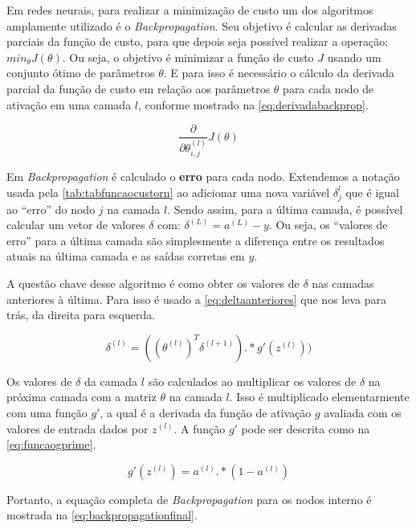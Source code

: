 Em redes neurais, para realizar a minimização de custo um dos algoritmos amplamente utilizado é o \textit{Backpropagation}. Seu objetivo é calcular as derivadas parciais da função de custo, para que depois seja possível realizar a operação: $min_{\theta}J(\theta)$. Ou seja, o objetivo é minimizar a função de custo $J$ usando um conjunto ótimo de parâmetros $\theta$. E para isso é necessário o cálculo da derivada parcial da função de custo em relação aos parâmetros $\theta$ para cada nodo de ativação em uma camada $l$, conforme mostrado na \autoref{eq:derivadabackprop}.

\begin{equation}\label{eq:derivadabackprop}
\frac{\partial}{\partial\theta_{i,j}^{(l)}} J(\theta)
\end{equation}


Em \textit{Backpropagation} é calculado o \textbf{erro} para cada nodo. Extendemos a notação usada pela \autoref{tab:tabfuncaocustorn} ao adicionar uma nova variável $\delta_j^{l}$ que é igual ao ``erro'' do nodo $j$ na camada $l$. Sendo assim, para a última camada, é possível calcular um vetor de valores $\delta$ com: $\delta^{(L)} = a^{(L)} - y$. Ou seja, os ``valores de erro'' para a última camada são simplesmente a diferença entre os resultados atuais na última camada e as saídas corretas em $y$.

A questão chave desse algoritmo é como obter os valores de $\delta$ nas camadas anteriores à última. Para isso é usado a \autoref{eq:deltaanteriores} que nos leva para trás, da direita para esquerda.

\begin{equation}\label{eq:deltaanteriores}
\delta^{(l)} = ((\theta^{(l)})^T \delta^{(l+1)}) .* g'(z^{(l)}))
\end{equation}

Os valores de $\delta$ da camada $l$ são calculados ao multiplicar os valores de $\delta$ na próxima camada com a matriz $\theta$ na camada $l$. Isso é multiplicado elementarmente com uma função $g'$, a qual é a derivada da função de ativação $g$ avaliada com os valores de entrada dados por $z^{(l)}$. A função $g'$ pode ser descrita como na \autoref{eq:funcaogprime}.

\begin{equation}\label{eq:funcaogprime}
g'(z^{(l)}) = a^{(l)} .* (1 - a^{(l)}) 
\end{equation}

Portanto, a equação completa de \textit{Backpropagation} para os nodos interno é mostrada na \autoref{eq:backpropagationfinal}.

